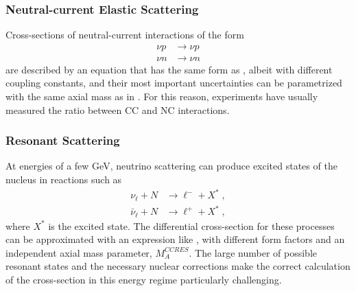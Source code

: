 \subsubsection{Neutral-current Elastic Scattering}
Cross-sections of neutral-current interactions of the form
\begin{equation}
\begin{aligned}
    \nu p &\rightarrow \nu p \\
    \nu n &\rightarrow \nu n
\end{aligned}
\end{equation}
are described by an equation that has the same form as , albeit with different coupling constants, and their most important uncertainties can be parametrized with the same axial mass as in .
For this reason, experiments have usually measured the ratio between CC and NC interactions.

\subsubsection{Resonant Scattering}
At energies of a few GeV, neutrino scattering can produce excited states of the nucleus in reactions such as
\begin{equation}
\begin{aligned}
    \nu_\ell + N &\rightarrow \ell^- + X^*\;, \\
    \bar{\nu}_\ell + N &\rightarrow \ell^+  + X^*\;,
\end{aligned}
\end{equation}
where $X^*$ is the excited state.
The differential cross-section for these processes can be approximated with an expression like , with different form factors and an independent axial mass parameter, $M_A^{CCRES}$.
The large number of possible resonant states and the necessary nuclear corrections make the correct calculation of the cross-section in this energy regime particularly challenging.

